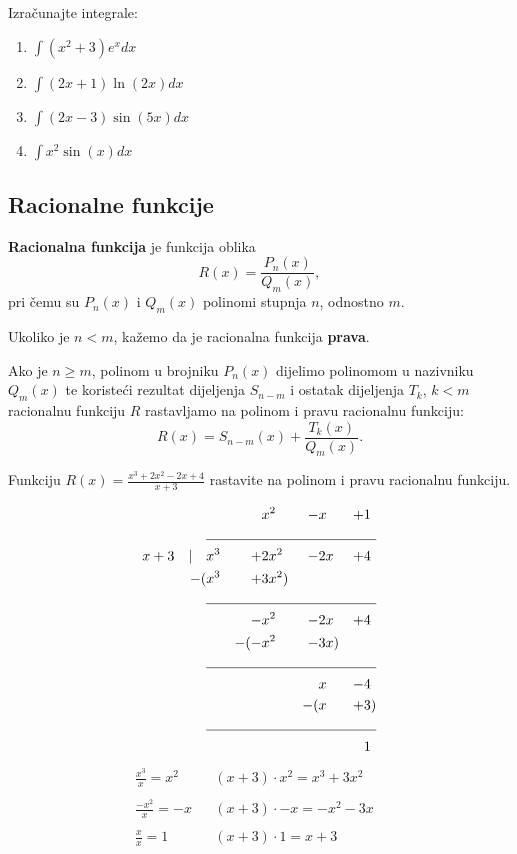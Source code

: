 \begin{example}
    Izračunajte integrale:
    \begin{enumerate}
        \item $\displaystyle \int (x^2+3)e^xdx$
        \item $\displaystyle \int (2x+1)\ln(2x)dx$
        \item $\displaystyle \int (2x-3)\sin(5x) dx$
        \item $\displaystyle \int x^2\sin(x)dx$
    \end{enumerate}
\end{example}

\subsection{Racionalne funkcije}

\textbf{Racionalna funkcija} je funkcija oblika
$$
R(x) = \frac{P_n(x)}{Q_m(x)},
$$
pri čemu su $P_n(x)$ i $Q_m(x)$ polinomi stupnja $n$, odnostno $m$.

Ukoliko je $n < m$, kažemo da je racionalna funkcija \textbf{prava}.

Ako je $n \geq m$, polinom u brojniku $P_n(x)$ dijelimo polinomom u nazivniku
$Q_m(x)$ te koristeći rezultat dijeljenja $S_{n-m}$ i ostatak dijeljenja $T_k$,
$k<m$ racionalnu funkciju $R$ rastavljamo na polinom i pravu racionalnu
funkciju:
$$
R(x) = S_{n-m}(x) + \frac{T_k(x)}{Q_m(x)}.
$$

\begin{example}
    Funkciju $R(x)=\frac{x^3+2x^2-2x+4}{x+3}$ rastavite na polinom i pravu
    racionalnu funkciju.
\end{example}

\begin{multicols}{2}
\begin{alignat*}{9}
                &&& x^2 &-& x &+& 1\\
                \cline{2-9}
x+3 \quad|\quad &x^3 &+& 2x^2 &-& 2x &+& 4 \\
                -(&x^3 &+& 3x^2)\\
                \cline{2-9}
                && -&x^2 &-&2x &+& 4 \\
                && -(-&x^2 &-& 3x) \\
                \cline{2-9}
                &&&&&x &-& 4\\
                &&&&-(&x &+& 3)\\
                \cline{2-9}
                &&&&&&&1
\end{alignat*}
\columnbreak
{}
\begin{align*}
    \frac{x^3}{x} = \boxed{x^2}&&(x+3)\cdot x^2 = \boxed{x^3 + 3x^2}&\\\\
    \frac{-x^2}{x} = \boxed{-x}&&(x+3)\cdot -x = \boxed{-x^2 - 3x}&\\\\
    \frac{x}{x} = \boxed{1}&&(x+3)\cdot 1 = \boxed{x+3}&\\
\end{align*}
\end{multicols}
